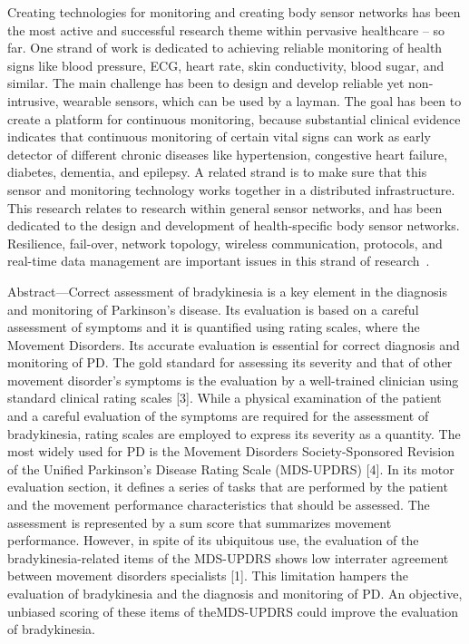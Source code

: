 Creating technologies for monitoring and creating body sensor networks has been the most active and successful research theme within pervasive healthcare – so far. One strand of work is dedicated to achieving reliable monitoring of health signs like blood pressure, ECG, heart rate, skin conductivity, blood sugar, and similar. The main challenge has been to design and develop reliable yet non-intrusive, wearable sensors, which can be used by a layman. The goal has
been to create a platform for continuous monitoring, because substantial clinical evidence indicates that continuous monitoring of certain vital signs can work as early detector of different chronic diseases like hypertension, congestive heart failure, diabetes, dementia, and epilepsy. A related
strand is to make sure that this sensor and monitoring technology works together in a distributed infrastructure. This research relates to research within general sensor networks, and has been dedicated to the design and development of health-specific body sensor networks. Resilience, fail-over, network topology, wireless communication, protocols, and real-time data management are important issues in this strand of research~\cite{bardram2008}.


Abstract—Correct assessment of bradykinesia is a key element in the diagnosis and monitoring of  Parkinson’s disease. Its evaluation is based on a careful assessment of symptoms and it is quantified using rating scales, where the Movement Disorders. Its accurate evaluation is essential for correct diagnosis and monitoring of PD. The gold standard for assessing its severity and that of other movement disorder’s symptoms is the evaluation by a well-trained clinician using standard clinical rating scales [3]. While a physical examination of the patient and a careful evaluation of the symptoms are required for the assessment of bradykinesia, rating scales are employed to express its severity as a quantity. The most widely used for PD is the Movement Disorders Society-Sponsored Revision of the Unified Parkinson’s Disease Rating Scale (MDS-UPDRS) [4]. In its motor evaluation section, it defines a series of tasks that are performed by the patient and the movement performance
characteristics that should be assessed. The assessment is represented by a sum score that summarizes movement performance. However, in spite of its ubiquitous use, the evaluation of the bradykinesia-related items of the MDS-UPDRS shows low interrater agreement between movement disorders specialists [1].
This limitation hampers the evaluation of bradykinesia and the diagnosis and monitoring of PD. An objective, unbiased scoring of these items of theMDS-UPDRS could improve the evaluation of bradykinesia.~\cite{bradmonitor2015}

